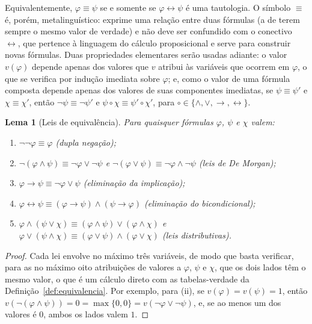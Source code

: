 \documentclass[12pt,a4paper,oneside]{report}
\theoremstyle{tituloplain}
\newtheorem{lema}[teorema]{Lema}
\theoremstyle{titulodef}
\begin{document}
Equivalentemente, $\varphi\equiv\psi$ se e somente se $\varphi\leftrightarrow\psi$ é uma tautologia. O símbolo $\equiv$ é, porém, metalinguístico: exprime uma relação entre duas fórmulas (a de terem sempre o mesmo valor de verdade) e não deve ser confundido com o conectivo $\leftrightarrow$, que pertence à linguagem do cálculo proposicional e serve para construir novas fórmulas. Duas propriedades elementares serão usadas adiante: o valor $v(\varphi)$ depende apenas dos valores que $v$ atribui às variáveis que ocorrem em $\varphi$, o que se verifica por indução imediata sobre $\varphi$; e, como o valor de uma fórmula composta depende apenas dos valores de suas componentes imediatas, se $\psi\equiv\psi'$ e $\chi\equiv\chi'$, então $\neg\psi\equiv\neg\psi'$ e $\psi\circ\chi\equiv\psi'\circ\chi'$, para $\circ\in\{\wedge,\vee,\rightarrow,\leftrightarrow\}$.

\begin{lema}[Leis de equivalência]\label{lem:leis}
Para quaisquer fórmulas $\varphi$, $\psi$ e $\chi$ valem:
\begin{enumerate}
  \item $\neg\neg\varphi\equiv\varphi$ (dupla negação);
  \item $\neg(\varphi\wedge\psi)\equiv\neg\varphi\vee\neg\psi$ e $\neg(\varphi\vee\psi)\equiv\neg\varphi\wedge\neg\psi$ (leis de De Morgan);
  \item $\varphi\rightarrow\psi\equiv\neg\varphi\vee\psi$ (eliminação da implicação);
  \item $\varphi\leftrightarrow\psi\equiv(\varphi\rightarrow\psi)\wedge(\psi\rightarrow\varphi)$ (eliminação do bicondicional);
  \item $\varphi\wedge(\psi\vee\chi)\equiv(\varphi\wedge\psi)\vee(\varphi\wedge\chi)$ e $\varphi\vee(\psi\wedge\chi)\equiv(\varphi\vee\psi)\wedge(\varphi\vee\chi)$ (leis distributivas).
\end{enumerate}
\end{lema}
\begin{proof}
Cada lei envolve no máximo três variáveis, de modo que basta verificar, para as no máximo oito atribuições de valores a $\varphi$, $\psi$ e $\chi$, que os dois lados têm o mesmo valor, o que é um cálculo direto com as tabelas-verdade da Definição~\ref{def:equivalencia}. Por exemplo, para (ii), se $v(\varphi)=v(\psi)=1$, então $v(\neg(\varphi\wedge\psi))=0=\max\{0,0\}=v(\neg\varphi\vee\neg\psi)$, e, se ao menos um dos valores é $0$, ambos os lados valem $1$.
\end{proof}
\end{document}
